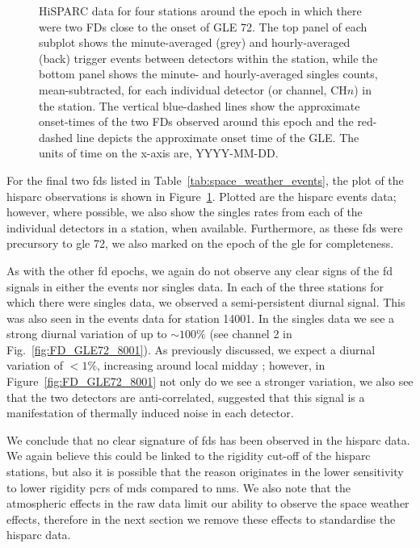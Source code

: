 \begin{figure}[htb!]
	\caption{HiSPARC data for four stations around the epoch in which there were two FDs close to the onset of GLE 72. The top panel of each subplot shows the minute-averaged (grey) and hourly-averaged (back) trigger events between detectors within the station, while the bottom panel shows the minute- and hourly-averaged singles counts, mean-subtracted, for each individual detector (or channel, CH$n$) in the station. The vertical blue-dashed lines show the approximate onset-times of the two FDs observed around this epoch and the red-dashed line depicts the approximate onset time of the GLE. The units of time on the x-axis are, YYYY-MM-DD.}
	\label{fig:FD_GLE72}
\end{figure}


For the final two \glspl{fd} listed in Table~\ref{tab:space_weather_events}, the plot of the \gls{hisparc} observations is shown in Figure~\ref{fig:FD_GLE72}. Plotted are the \gls{hisparc} events data; however, where possible, we also show the singles rates from each of the individual detectors in a station, when available. Furthermore, as these \glspl{fd} were precursory to \gls{gle} 72, we also marked on the epoch of the \gls{gle} for completeness.



As with the other \gls{fd} epochs, we again do not observe any clear signs of the \gls{fd} signals in either the events nor singles data. In each of the three stations for which there were singles data, we observed a semi-persistent diurnal signal. This was also seen in the events data for station 14001. In the singles data we see a strong diurnal variation of up to $\sim 100\%$ (see channel 2 in Fig.~\ref{fig:FD_GLE72_8001}). As previously discussed, we expect a diurnal variation of $< 1\%$, increasing around local midday \citep{mishra_study_2007, mishra_cosmic_2008, dubey_cosmic_2016, thomas_decadal_2017}; however, in Figure~\ref{fig:FD_GLE72_8001} not only do we see a stronger variation, we also see that the two detectors are anti-correlated, suggested that this signal is a manifestation of thermally induced noise in each detector.



We conclude that no clear signature of \glspl{fd} has been observed in the \gls{hisparc} data. We again believe this could be linked to the rigidity cut-off of the \gls{hisparc} stations, but also it is possible that the reason originates in the lower sensitivity to lower rigidity \glspl{pcr} of \glspl{md} compared to \glspl{nm}. We also note that the atmospheric effects in the raw data limit our ability to observe the space weather effects, therefore in the next section we remove these effects to standardise the \gls{hisparc} data. 


